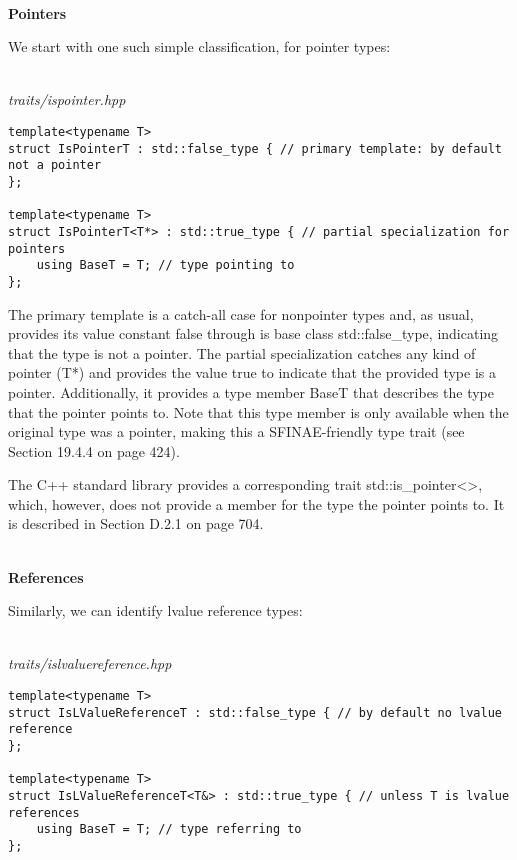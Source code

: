 \hspace*{\fill} \\ %
\noindent
\textbf{Pointers}

We start with one such simple classification, for pointer types:

\hspace*{\fill} \\ %
\noindent
\textit{traits/ispointer.hpp}
\begin{lstlisting}[style=styleCXX]
template<typename T>
struct IsPointerT : std::false_type { // primary template: by default not a pointer
};

template<typename T>
struct IsPointerT<T*> : std::true_type { // partial specialization for pointers
	using BaseT = T; // type pointing to
};
\end{lstlisting}

The primary template is a catch-all case for nonpointer types and, as usual, provides its value constant false through is base class std::false\_type, indicating that the type is not a pointer. The partial specialization catches any kind of pointer (T*) and provides the value true to indicate that the provided type is a pointer. Additionally, it provides a type member BaseT that describes the type that the pointer points to. Note that this type member is only available when the original type was a pointer, making this a SFINAE-friendly type trait (see Section 19.4.4 on page 424).

The C++ standard library provides a corresponding trait std::is\_pointer<>, which, however, does not provide a member for the type the pointer points to. It is described in Section D.2.1 on page 704.

\hspace*{\fill} \\ %
\noindent
\textbf{References}

Similarly, we can identify lvalue reference types:

\hspace*{\fill} \\ %
\noindent
\textit{traits/islvaluereference.hpp}
\begin{lstlisting}[style=styleCXX]
template<typename T>
struct IsLValueReferenceT : std::false_type { // by default no lvalue reference
};

template<typename T>
struct IsLValueReferenceT<T&> : std::true_type { // unless T is lvalue references
	using BaseT = T; // type referring to
};
\end{lstlisting}

